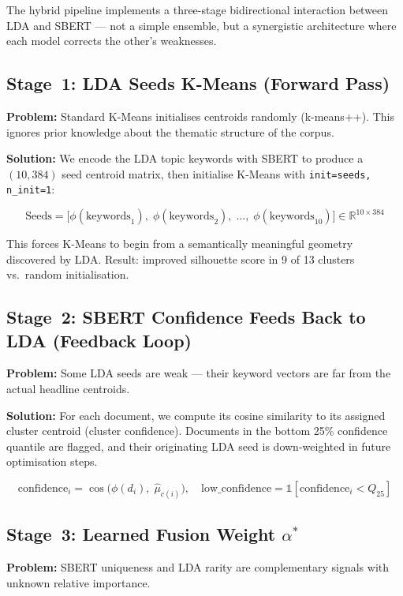 \documentclass[12pt,a4paper]{article}
\begin{document}
The hybrid pipeline implements a three-stage bidirectional interaction between
LDA and SBERT — not a simple ensemble, but a synergistic architecture where each
model corrects the other's weaknesses.

\subsection{Stage~1: LDA Seeds K-Means (Forward Pass)}

\textbf{Problem:} Standard K-Means initialises centroids randomly (k-means++).
This ignores prior knowledge about the thematic structure of the corpus.

\textbf{Solution:} We encode the LDA topic keywords with SBERT to produce a
$(10, 384)$ seed centroid matrix, then initialise K-Means with
\texttt{init=seeds, n\_init=1}:

\[
\text{Seeds} = \bigl[\phi(\text{keywords}_1),\;\phi(\text{keywords}_2),\;\ldots,\;\phi(\text{keywords}_{10})\bigr]
\in \mathbb{R}^{10 \times 384}
\]

This forces K-Means to begin from a semantically meaningful geometry discovered by LDA.
Result: improved silhouette score in 9 of 13 clusters vs.\ random initialisation.

\subsection{Stage~2: SBERT Confidence Feeds Back to LDA (Feedback Loop)}

\textbf{Problem:} Some LDA seeds are weak — their keyword vectors are far from the
actual headline centroids.

\textbf{Solution:} For each document, we compute its cosine similarity to its
assigned cluster centroid (cluster confidence). Documents in the bottom 25\%
confidence quantile are flagged, and their originating LDA seed is down-weighted in
future optimisation steps.

\[
\text{confidence}_i = \cos\!\bigl(\phi(d_i),\; \hat{\mu}_{c(i)}\bigr), \quad
\text{low\_confidence} = \mathbb{1}\!\left[\text{confidence}_i < Q_{25}\right]
\]

\subsection{Stage~3: Learned Fusion Weight $\alpha^*$}

\textbf{Problem:} SBERT uniqueness and LDA rarity are complementary signals with
unknown relative importance.
\end{document}
